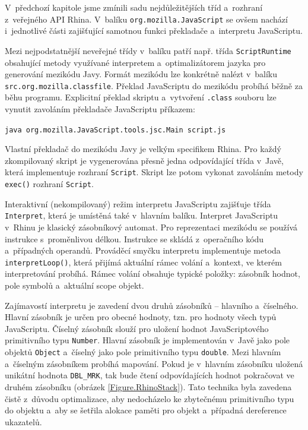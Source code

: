 V~předchozí kapitole jsme zmínili sadu nejdůležitějších tříd a~rozhraní z~veřejného API Rhina. V~balíku \texttt{org.mozilla.JavaScript} se ovšem nachází i~jednotlivé části zajišťující samotnou funkci překladače a~interpretu JavaScriptu.

Mezi nejpodstatnější neveřejné třídy v~balíku patří např. třída \texttt{ScriptRuntime} obsahující metody využívané interpretem a~optimalizátorem jazyka pro generování mezikódu Javy. Formát mezikódu lze konkrétně nalézt v~balíku \texttt{src.org.mozilla.classfile}. Překlad JavaScriptu do mezikódu probíhá běžně za běhu programu. Explicitní překlad skriptu a~vytvoření \texttt{.class} souboru lze vynutit zavoláním překladače JavaScriptu příkazem:

\medskip
\centerline{\texttt{java org.mozilla.JavaScript.tools.jsc.Main script.js}}
\medskip

Vlastní překladač do mezikódu Javy je velkým specifikem Rhina. Pro každý zkompilovaný skript je vygenerována přesně jedna odpovídající třída v~Javě, která implementuje rozhraní \texttt{Script}. Skript lze potom vykonat zavoláním metody \texttt{exec()} rozhraní \texttt{Script}.

Interaktivní (nekompilovaný) režim interpretu JavaScriptu zajišťuje třída \texttt{Interpret}, která je umístěná také v~hlavním balíku. Interpret JavaScriptu v~Rhinu je klasický zásobníkový automat. Pro reprezentaci mezikódu se používá instrukce s~proměnlivou délkou. Instrukce se skládá z~operačního kódu a~případných operandů. Prováděcí smyčku interpretu implementuje metoda \texttt{interpretLoop()}, která přijímá aktuální rámec volání a~kontext, ve kterém interpretování probíhá. Rámec volání obsahuje typické položky: zásobník hodnot, pole symbolů a~aktuální scope objekt.

Zajímavostí interpretu je zavedení dvou druhů zásobníků -- hlavního a~číselného. Hlavní zásobník je určen pro obecné hodnoty, tzn. pro hodnoty všech typů JavaScriptu. Číselný zásobník slouží pro uložení hodnot JavaScriptového primitivního typu \texttt{Number}. Hlavní zásobník je implementován v~Javě jako pole objektů \texttt{Object} a~číselný jako pole primitivního typu \texttt{double}. Mezi hlavním a~číselným zásobníkem probíhá mapování. Pokud je v~hlavním zásobníku uložená unikátní hodnota \texttt{DBL\_MRK}, tak bude čtení odpovídajících hodnot pokračovat ve druhém zásobníku (obrázek \ref{Figure.RhinoStack}). Tato technika byla zavedena čistě z~důvodu optimalizace, aby nedocházelo ke zbytečnému  primitivního typu do objektu a~aby se šetřila alokace paměti pro objekt a~případná dereference ukazatelů.

